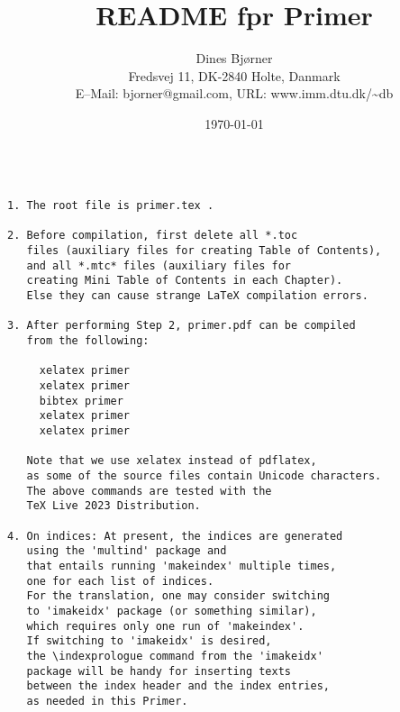 \documentclass[twoside,10pt]{article}
\title{README fpr Primer}
\author{Dines Bj{\o}rner\\ 
 Fredsvej 11, DK-2840 Holte, Danmark\\ 
 E--Mail: bjorner@gmail.com, URL: www.imm.dtu.dk/\~{}db}
\date{\today}
\begin{document}
\maketitle

\begin{verbatim}

1. The root file is primer.tex .

2. Before compilation, first delete all *.toc 
   files (auxiliary files for creating Table of Contents),
   and all *.mtc* files (auxiliary files for 
   creating Mini Table of Contents in each Chapter). 
   Else they can cause strange LaTeX compilation errors.

3. After performing Step 2, primer.pdf can be compiled 
   from the following:

     xelatex primer
     xelatex primer
     bibtex primer
     xelatex primer
     xelatex primer

   Note that we use xelatex instead of pdflatex, 
   as some of the source files contain Unicode characters.
   The above commands are tested with the 
   TeX Live 2023 Distribution.
   
4. On indices: At present, the indices are generated 
   using the 'multind' package and
   that entails running 'makeindex' multiple times, 
   one for each list of indices.
   For the translation, one may consider switching 
   to 'imakeidx' package (or something similar),
   which requires only one run of 'makeindex'. 
   If switching to 'imakeidx' is desired,
   the \indexprologue command from the 'imakeidx' 
   package will be handy for inserting texts
   between the index header and the index entries, 
   as needed in this Primer.
\end{verbatim}
\end{document}
